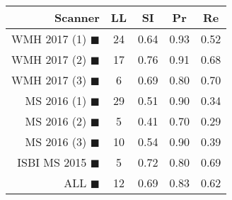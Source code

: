 \begin{tabular}{rcccc}
\toprule
Scanner & LL & SI & Pr & Re \\
\midrule
WMH 2017 (1) {\color[rgb]{ 1.00 0.00 0.00}$\blacksquare$} & 24 & 0.64 & 0.93 & 0.52 \\
WMH 2017 (2) {\color[rgb]{ 1.00 0.50 0.00}$\blacksquare$} & 17 & 0.76 & 0.91 & 0.68 \\
WMH 2017 (3) {\color[rgb]{ 1.00 0.80 0.00}$\blacksquare$} & 6 & 0.69 & 0.80 & 0.70 \\
MS  2016 (1) {\color[rgb]{ 0.20 0.80 0.00}$\blacksquare$} & 29 & 0.51 & 0.90 & 0.34 \\
MS  2016 (2) {\color[rgb]{ 0.00 0.40 1.00}$\blacksquare$} & 5 & 0.41 & 0.70 & 0.29 \\
MS  2016 (3) {\color[rgb]{ 0.60 0.00 1.00}$\blacksquare$} & 10 & 0.54 & 0.90 & 0.39 \\
ISBI MS 2015 {\color[rgb]{ 1.00 0.00 1.00}$\blacksquare$} & 5 & 0.72 & 0.80 & 0.69 \\
\midrule
ALL {\color[rgb]{ 1.00 1.00 1.00}$\blacksquare$} & 12 & 0.69 & 0.83 & 0.62 \\
\bottomrule
\end{tabular}